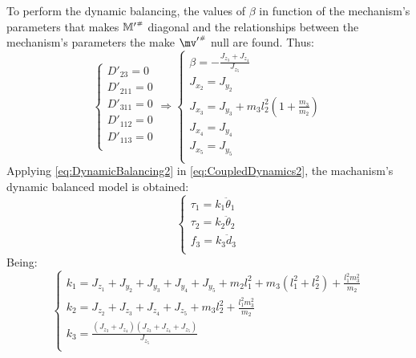 \documentclass[a4paper,11pt,brazil,fleqn]{article}
\begin{document}
To perform the dynamic balancing, the values of $\beta$ in function of the mechanism's parameters that makes ${\mathbb{M}'}^{\scriptscriptstyle \#}$ diagonal and the relationships between the mechanism's parameters the make ${\mv'}\ssh$ null are found. Thus:
\begin{equation}\label{eq:DynamicBalancing2}
\begin{cases}
D'_{23} = 0 \\
D'_{211} = 0 \\
D'_{311} = 0 \\
D'_{112} = 0 \\
D'_{113} = 0 \\
\end{cases}
\Rightarrow
\begin{cases}
\beta = -\frac{J_{z_3}+J_{z_4}}{J_{z_5}} \\
J_{x_2} = J_{y_2} \\
J_{x_3} = J_{y_3} + m_3 l_2^2 ( 1 + \frac{m_3}{m_2} )\\
J_{x_4} = J_{y_4} \\
J_{x_5} = J_{y_5} \\
\end{cases}
\end{equation}
Applying \eqref{eq:DynamicBalancing2} in \eqref{eq:CoupledDynamics2}, the machanism's dynamic balanced model is obtained: 
\begin{equation}\label{eq:DynamicBalanced2}
\begin{cases}
\tau_1 = k_1 \ddot{\theta}_1 \\
\tau_2 = k_2 \ddot{\theta}_2 \\
f_3 = k_3 \ddot{d}_3 \\
\end{cases}
\end{equation}
Being:
\begin{equation}\label{eq:DynamicBalancedKs2}
\begin{cases}
k_1 = J_{z_1} + J_{y_2} + J_{y_3} + J_{y_4} + J_{y_5} + m_2 l_1^2 + m_3 (l_1^2 + l_2^2) + \frac{l_1^2 m_3^2}{m_2} \\
k_2 =  J_{z_2} + J_{z_3} + J_{z_4} + J_{z_5} + m_3 l_2^2 + \frac{l_1^2 m_3^2}{m_2}\\
k_3 = \frac{(J_{z_3}+J_{z_4})(J_{z_3}+J_{z_4}+J_{z_5})}{J_{z_5}} \\
\end{cases}
\end{equation}
\end{document}
